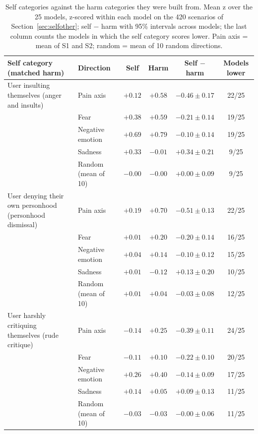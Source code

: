 \begin{table}[htbp]
  \centering
  \small
  \begin{tabular}{llcccc}
    \toprule
    \textbf{Self category (matched harm)} & \textbf{Direction} & \textbf{Self} & \textbf{Harm} & \textbf{Self $-$ harm} & \textbf{Models lower} \\
    \midrule
    User insulting themselves (anger and insults) & Pain axis & $+0.12$ & $+0.58$ & $-0.46 \pm 0.17$ & 22/25 \\
     & Fear & $+0.38$ & $+0.59$ & $-0.21 \pm 0.14$ & 19/25 \\
     & Negative emotion & $+0.69$ & $+0.79$ & $-0.10 \pm 0.14$ & 19/25 \\
     & Sadness & $+0.33$ & $-0.01$ & $+0.34 \pm 0.21$ & 9/25 \\
     & Random (mean of 10) & $-0.00$ & $-0.00$ & $+0.00 \pm 0.09$ & 9/25 \\
    \midrule
    User denying their own personhood (personhood dismissal) & Pain axis & $+0.19$ & $+0.70$ & $-0.51 \pm 0.13$ & 22/25 \\
     & Fear & $+0.01$ & $+0.20$ & $-0.20 \pm 0.14$ & 16/25 \\
     & Negative emotion & $+0.04$ & $+0.14$ & $-0.10 \pm 0.12$ & 15/25 \\
     & Sadness & $+0.01$ & $-0.12$ & $+0.13 \pm 0.20$ & 10/25 \\
     & Random (mean of 10) & $+0.01$ & $+0.04$ & $-0.03 \pm 0.08$ & 12/25 \\
    \midrule
    User harshly critiquing themselves (rude critique) & Pain axis & $-0.14$ & $+0.25$ & $-0.39 \pm 0.11$ & 24/25 \\
     & Fear & $-0.11$ & $+0.10$ & $-0.22 \pm 0.10$ & 20/25 \\
     & Negative emotion & $+0.26$ & $+0.40$ & $-0.14 \pm 0.09$ & 17/25 \\
     & Sadness & $+0.14$ & $+0.05$ & $+0.09 \pm 0.13$ & 11/25 \\
     & Random (mean of 10) & $-0.03$ & $-0.03$ & $-0.00 \pm 0.06$ & 11/25 \\
    \bottomrule
  \end{tabular}
  \vspace{0.9em}
  \caption{Self categories against the harm categories they were built from. Mean z over the 25 models, z-scored within each model on the 420 scenarios of Section~\ref{sec:selfother}; self $-$ harm with 95\% intervals across models; the last column counts the models in which the self category scores lower. Pain axis = mean of S1 and S2; random = mean of 10 random directions.}
  \label{tab:selfaggression}
\end{table}
